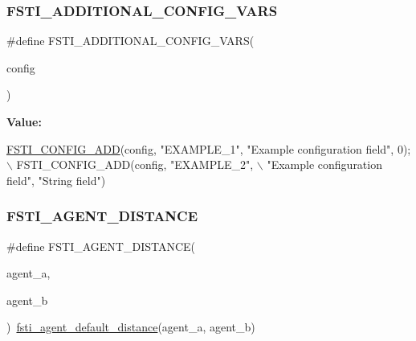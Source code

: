 \subsubsection{\texorpdfstring{F\+S\+T\+I\+\_\+\+A\+D\+D\+I\+T\+I\+O\+N\+A\+L\+\_\+\+C\+O\+N\+F\+I\+G\+\_\+\+V\+A\+RS}{FSTI\_ADDITIONAL\_CONFIG\_VARS}}
{\footnotesize\ttfamily \#define F\+S\+T\+I\+\_\+\+A\+D\+D\+I\+T\+I\+O\+N\+A\+L\+\_\+\+C\+O\+N\+F\+I\+G\+\_\+\+V\+A\+RS(\begin{DoxyParamCaption}\item[{}]{config }\end{DoxyParamCaption})}

{\bfseries Value\+:}
\begin{DoxyCode}
\mbox{\hyperlink{fsti-config_8h_afa6ddaacee2774aa511014d325d62d84}{FSTI\_CONFIG\_ADD}}(config, \textcolor{stringliteral}{"EXAMPLE\_1"}, \textcolor{stringliteral}{"Example configuration field"}, 0); \(\backslash\)
    FSTI\_CONFIG\_ADD(config, \textcolor{stringliteral}{"EXAMPLE\_2"},                                \(\backslash\)
                    \textcolor{stringliteral}{"Example configuration field"}, \textcolor{stringliteral}{"String field"})
\end{DoxyCode}
\mbox{\label{fsti-defaults_8h_a89dc08f474071d0d1e96eeb185b69bec}} 
\subsubsection{\texorpdfstring{F\+S\+T\+I\+\_\+\+A\+G\+E\+N\+T\+\_\+\+D\+I\+S\+T\+A\+N\+CE}{FSTI\_AGENT\_DISTANCE}}
{\footnotesize\ttfamily \#define F\+S\+T\+I\+\_\+\+A\+G\+E\+N\+T\+\_\+\+D\+I\+S\+T\+A\+N\+CE(\begin{DoxyParamCaption}\item[{}]{agent\+\_\+a,  }\item[{}]{agent\+\_\+b }\end{DoxyParamCaption})~\mbox{\hyperlink{fsti-agent_8h_a0624a840237ec82520be71b241220226}{fsti\+\_\+agent\+\_\+default\+\_\+distance}}(agent\+\_\+a, agent\+\_\+b)}

\mbox{\label{fsti-defaults_8h_ae8d43f5c182bec36fb3c3d06e72c6e3a}} 
